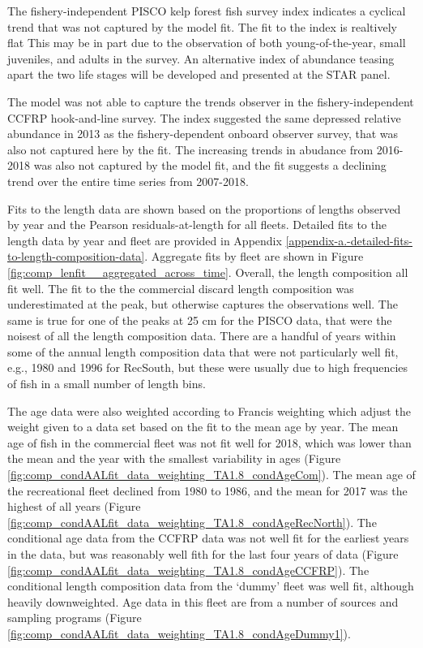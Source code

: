 \documentclass[12pt,]{article}
\begin{document}
The fishery-independent PISCO kelp forest fish survey index indicates a
cyclical trend that was not captured by the model fit. The fit to the
index is realtively flat This may be in part due to the observation of
both young-of-the-year, small juveniles, and adults in the survey. An
alternative index of abundance teasing apart the two life stages will be
developed and presented at the STAR panel.

The model was not able to capture the trends observer in the
fishery-independent CCFRP hook-and-line survey. The index suggested the
same depressed relative abundance in 2013 as the fishery-dependent
onboard observer survey, that was also not captured here by the fit. The
increasing trends in abudance from 2016-2018 was also not captured by
the model fit, and the fit suggests a declining trend over the entire
time series from 2007-2018.

Fits to the length data are shown based on the proportions of lengths
observed by year and the Pearson residuals-at-length for all fleets.
Detailed fits to the length data by year and fleet are provided in
Appendix \ref{appendix-a.-detailed-fits-to-length-composition-data}.
Aggregate fits by fleet are shown in Figure
\ref{fig:comp_lenfit__aggregated_across_time}. Overall, the length
composition all fit well. The fit to the the commercial discard length
composition was underestimated at the peak, but otherwise captures the
observations well. The same is true for one of the peaks at 25 cm for
the PISCO data, that were the noisest of all the length composition
data. There are a handful of years within some of the annual length
composition data that were not particularly well fit, e.g., 1980 and
1996 for RecSouth, but these were usually due to high frequencies of
fish in a small number of length bins.

The age data were also weighted according to Francis weighting which
adjust the weight given to a data set based on the fit to the mean age
by year. The mean age of fish in the commercial fleet was not fit well
for 2018, which was lower than the mean and the year with the smallest
variability in ages (Figure
\ref{fig:comp_condAALfit_data_weighting_TA1.8_condAgeCom}). The mean age
of the recreational fleet declined from 1980 to 1986, and the mean for
2017 was the highest of all years (Figure
\ref{fig:comp_condAALfit_data_weighting_TA1.8_condAgeRecNorth}). The
conditional age data from the CCFRP data was not well fit for the
earliest years in the data, but was reasonably well fith for the last
four years of data (Figure
\ref{fig:comp_condAALfit_data_weighting_TA1.8_condAgeCCFRP}). The
conditional length composition data from the `dummy' fleet was well fit,
although heavily downweighted. Age data in this fleet are from a number
of sources and sampling programs (Figure
\ref{fig:comp_condAALfit_data_weighting_TA1.8_condAgeDummy1}).
\end{document}
